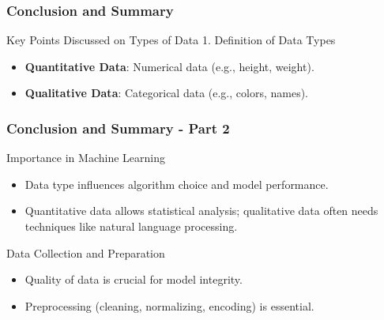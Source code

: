 \documentclass[aspectratio=169]{beamer}
\begin{document}
\begin{frame}[fragile]
    \frametitle{Conclusion and Summary}
    \begin{block}{Key Points Discussed on Types of Data}
        1. Definition of Data Types
        \begin{itemize}
            \item \textbf{Quantitative Data}: Numerical data (e.g., height, weight).
            \item \textbf{Qualitative Data}: Categorical data (e.g., colors, names).
        \end{itemize}
    \end{block}
\end{frame}

\begin{frame}[fragile]
    \frametitle{Conclusion and Summary - Part 2}
    \begin{block}{Importance in Machine Learning}
        \begin{itemize}
            \item Data type influences algorithm choice and model performance.
            \item Quantitative data allows statistical analysis; qualitative data often needs techniques like natural language processing.
        \end{itemize}
    \end{block}
    
    \begin{block}{Data Collection and Preparation}
        \begin{itemize}
            \item Quality of data is crucial for model integrity.
            \item Preprocessing (cleaning, normalizing, encoding) is essential.
        \end{itemize}
    \end{block}
\end{frame}
\end{document}
